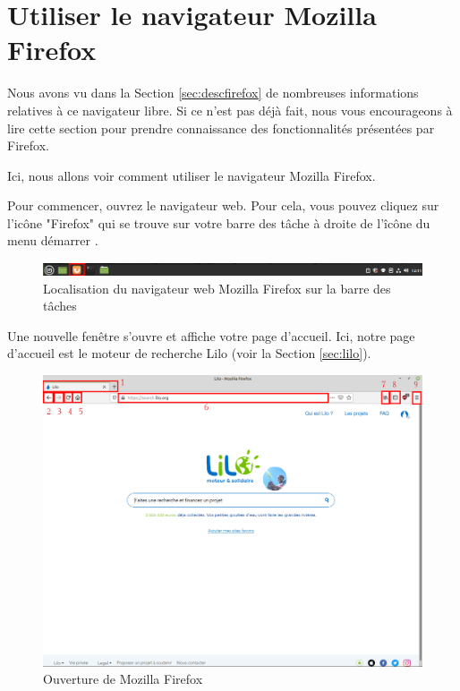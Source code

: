\documentclass[12pt]{book}
\begin{document}
\section{Utiliser le navigateur Mozilla Firefox}\label{sec:utiliserfirefox}
	Nous avons vu dans la Section \ref{sec:descfirefox} de nombreuses informations relatives à ce navigateur libre.
	Si ce n'est pas déjà fait, nous vous encourageons à lire cette section pour prendre connaissance des fonctionnalités présentées par Firefox.\par
	Ici, nous allons voir comment utiliser le navigateur Mozilla Firefox.\par
	Pour commencer, ouvrez le navigateur web.
	Pour cela, vous pouvez cliquez sur l'icône "Firefox" qui se trouve sur votre barre des tâche à droite de l'îcône du menu démarrer .
	\begin{figure}[h]
		\centering
		\includegraphics[width=\textwidth]{include/mf_barre.png}
		\caption{Localisation du navigateur web Mozilla Firefox sur la barre des tâches}
		\label{fig:mf_barre}
	\end{figure}\par
	Une nouvelle fenêtre s'ouvre et affiche votre page d'accueil.
	Ici, notre page d'accueil est le moteur de recherche Lilo (voir la Section \ref{sec:lilo}).
	\begin{figure}[h]
		\centering
		\includegraphics[width=.9\textwidth]{include/accueil_mf.png}
		\caption{Ouverture de Mozilla Firefox}
		\label{fig:accueil_mf}
	\end{figure}
\end{document}

